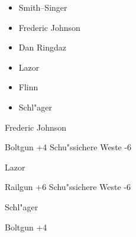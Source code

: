 \begin{column}[l]{0.45}
    \begin{itemize}
        \item Smith--Singer
        \item Frederic Johnson
        \item Dan Ringdaz
        \item Lazor
        \item Flinn
        \item Schl"ager
    \end{itemize}

    \begin{nscsheet}[h]{Frederic Johnson}
        \nscstats[ATT=3,AGG=4,EMP=4,KNO=5,HP=10]
        \nscruler
        \begin{nscinventory}
            \nscitem[Waffen] Boltgun +4
            \nscitem[R"ustung] Schu"ssichere Weste -6           
        \end{nscinventory}
    \end{nscsheet}

    \begin{nscsheet}[h]{Lazor}
        \nscstats[ATT=6,AGG=5,EMP=2,KNO=4,HP=12]
        \nscruler
        \begin{nscinventory}
            \nscitem[Waffen] Railgun +6
            \nscitem[R"ustung] Schu"ssichere Weste -6           
        \end{nscinventory}
    \end{nscsheet}


    \begin{nscsheet}[h]{Schl"ager}
        \nscstats[ATT=3,AGG=2,EMP=1,KNO=1,HP=10]
        \nscruler
        \begin{nscinventory}
            \nscitem[Waffen] Boltgun +4            
        \end{nscinventory}
    \end{nscsheet}    
\end{column}
